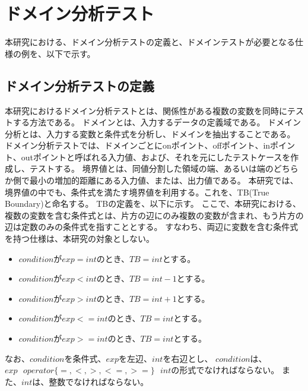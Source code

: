 \documentclass[uplatex, report, a4j, 10pt]{jsbook}
\begin{document}
\section{ドメイン分析テスト}\label{cha:domain}
本研究における、ドメイン分析テストの定義と、ドメインテストが必要となる仕様の例を、以下で示す。

\subsection{ドメイン分析テストの定義}\label{sec:define}
本研究におけるドメイン分析テストとは、関係性がある複数の変数を同時にテストする方法である\cite{izon}\cite{istqb}。
ドメインとは、入力するデータの定義域である。
ドメイン分析とは、入力する変数と条件式を分析し、ドメインを抽出することである。
ドメイン分析テストでは、ドメインごとにonポイント、offポイント、inポイント、outポイントと呼ばれる入力値、および、それを元にしたテストケースを作成し、テストする。
境界値とは、同値分割した領域の端、あるいは端のどちらか側で最小の増加的距離にある入力値、または、出力値である\cite{istqb}。
本研究では、境界値の中でも、条件式を満たす境界値を利用する。これを、TB(True Boundary)と命名する。
TBの定義を、以下に示す。
ここで、本研究における、複数の変数を含む条件式とは、片方の辺にのみ複数の変数が含まれ、もう片方の辺は定数のみの条件式を指すこととする。
すなわち、両辺に変数を含む条件式を持つ仕様は、本研究の対象としない。
\begin{itemize}
  \item $condition$が$exp = int$のとき、$TB = int$とする。
  \item $condition$が$exp < int$のとき、$TB = int - 1$とする。
  \item $condition$が$exp > int$のとき、$TB = int + 1$とする。
  \item $condition$が$exp <= int$のとき、$TB = int$とする。
  \item $condition$が$exp >= int$のとき、$TB = int$とする。
\end{itemize}
なお、$condition$を条件式、$exp$を左辺、$int$を右辺とし、
$condition$は、$exp ~~~ operator\{=, <, >, <=, >=\} ~~~ int$の形式でなければならない。
また、$int$は、整数でなければならない。
\end{document}
